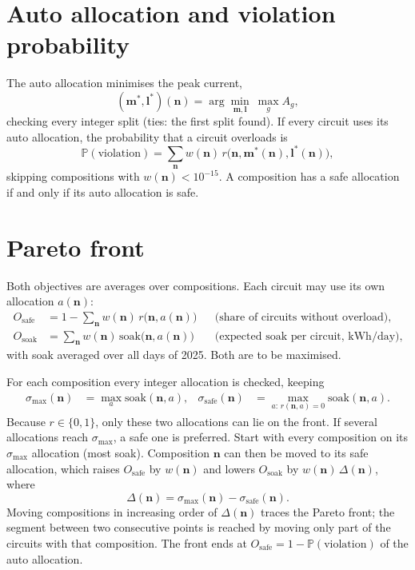 \documentclass[11pt,a4paper]{article}
\newcommand{\Prob}{\mathbb{P}}
\begin{document}
\section{Auto allocation and violation probability}
The auto allocation minimises the peak current,
\begin{equation}
  (\boldsymbol m^*,\boldsymbol l^*)(\boldsymbol n)
  =\arg\min_{\boldsymbol m,\boldsymbol l}\ \max_g A_g ,
\end{equation}
checking every integer split (ties: the first split found). If every circuit uses its
auto allocation, the probability that a circuit overloads is
\begin{equation}
  \Prob(\text{violation})=\sum_{\boldsymbol n} w(\boldsymbol n)\,
  r\bigl(\boldsymbol n,\boldsymbol m^*(\boldsymbol n),\boldsymbol l^*(\boldsymbol n)\bigr),
\end{equation}
skipping compositions with \(w(\boldsymbol n)<10^{-15}\). A composition has a safe
allocation if and only if its auto allocation is safe.

\section{Pareto front}
Both objectives are averages over compositions. Each circuit may use its own
allocation \(a(\boldsymbol n)\):
\begin{align}
  O_{\mathrm{safe}} &= 1-\sum_{\boldsymbol n} w(\boldsymbol n)\, r\bigl(\boldsymbol n,a(\boldsymbol n)\bigr)
      && \text{(share of circuits without overload)},\\
  O_{\mathrm{soak}} &= \sum_{\boldsymbol n} w(\boldsymbol n)\, \text{soak}\bigl(\boldsymbol n,a(\boldsymbol n)\bigr)
      && \text{(expected soak per circuit, kWh/day)},
\end{align}
with soak averaged over all days of 2025. Both are to be maximised.

For each composition every integer allocation is checked, keeping
\begin{align}
  \sigma_{\max}(\boldsymbol n) &= \max_a \text{soak}(\boldsymbol n,a), &
  \sigma_{\mathrm{safe}}(\boldsymbol n) &= \max_{a:\,r(\boldsymbol n,a)=0} \text{soak}(\boldsymbol n,a).
\end{align}
Because \(r\in\{0,1\}\), only these two allocations can lie on the front. If
several allocations reach \(\sigma_{\max}\), a safe one is preferred.
Start with every composition on its \(\sigma_{\max}\) allocation (most soak).
Composition \(\boldsymbol n\) can then be moved to its safe allocation, which raises
\(O_{\mathrm{safe}}\) by \(w(\boldsymbol n)\) and lowers \(O_{\mathrm{soak}}\) by
\(w(\boldsymbol n)\,\Delta(\boldsymbol n)\), where
\begin{equation}
  \Delta(\boldsymbol n)=\sigma_{\max}(\boldsymbol n)-\sigma_{\mathrm{safe}}(\boldsymbol n).
\end{equation}
Moving compositions in increasing order of \(\Delta(\boldsymbol n)\) traces the
Pareto front; the segment between two consecutive points is reached by moving
only part of the circuits with that composition. The front ends at
\(O_{\mathrm{safe}}=1-\Prob(\text{violation})\) of the auto allocation.
\end{document}
